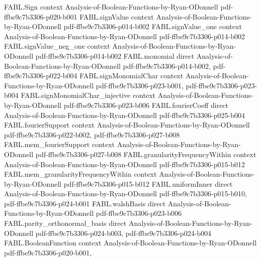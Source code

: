 \begin{theorem}
\label{FABL.noiseOperator_monomial_apply}
\leanok
{}
\proofstep
  {FABL.Sign}
  {context}
  {Analysis-of-Boolean-Functions-by-Ryan-ODonnell}
  {pdf-ffbe9c7b3306-p020-b001}
\proofstep
  {FABL.signValue}
  {context}
  {Analysis-of-Boolean-Functions-by-Ryan-ODonnell}
  {pdf-ffbe9c7b3306-p014-b002}
\proofstep
  {FABL.signValue_one}
  {context}
  {Analysis-of-Boolean-Functions-by-Ryan-ODonnell}
  {pdf-ffbe9c7b3306-p014-b002}
\proofstep
  {FABL.signValue_neg_one}
  {context}
  {Analysis-of-Boolean-Functions-by-Ryan-ODonnell}
  {pdf-ffbe9c7b3306-p014-b002}
\proofstep
  {FABL.monomial}
  {direct}
  {Analysis-of-Boolean-Functions-by-Ryan-ODonnell}
  {pdf-ffbe9c7b3306-p014-b002,
    pdf-ffbe9c7b3306-p022-b004}
\proofstep
  {FABL.signMonomialChar}
  {context}
  {Analysis-of-Boolean-Functions-by-Ryan-ODonnell}
  {pdf-ffbe9c7b3306-p023-b001,
    pdf-ffbe9c7b3306-p023-b004}
\proofstep
  {FABL.signMonomialChar_injective}
  {context}
  {Analysis-of-Boolean-Functions-by-Ryan-ODonnell}
  {pdf-ffbe9c7b3306-p023-b006}
\proofstep
  {FABL.fourierCoeff}
  {direct}
  {Analysis-of-Boolean-Functions-by-Ryan-ODonnell}
  {pdf-ffbe9c7b3306-p025-b004}
\proofstep
  {FABL.fourierSupport}
  {context}
  {Analysis-of-Boolean-Functions-by-Ryan-ODonnell}
  {pdf-ffbe9c7b3306-p022-b002,
    pdf-ffbe9c7b3306-p027-b008}
\proofstep
  {FABL.mem_fourierSupport}
  {context}
  {Analysis-of-Boolean-Functions-by-Ryan-ODonnell}
  {pdf-ffbe9c7b3306-p027-b008}
\proofstep
  {FABL.granularityFrequencyWithin}
  {context}
  {Analysis-of-Boolean-Functions-by-Ryan-ODonnell}
  {pdf-ffbe9c7b3306-p015-b012}
\proofstep
  {FABL.mem_granularityFrequencyWithin}
  {context}
  {Analysis-of-Boolean-Functions-by-Ryan-ODonnell}
  {pdf-ffbe9c7b3306-p015-b012}
\proofstep
  {FABL.uniformInner}
  {direct}
  {Analysis-of-Boolean-Functions-by-Ryan-ODonnell}
  {pdf-ffbe9c7b3306-p015-b010,
    pdf-ffbe9c7b3306-p024-b001}
\proofstep
  {FABL.walshBasis}
  {direct}
  {Analysis-of-Boolean-Functions-by-Ryan-ODonnell}
  {pdf-ffbe9c7b3306-p023-b006}
\proofstep
  {FABL.parity_orthonormal_basis}
  {direct}
  {Analysis-of-Boolean-Functions-by-Ryan-ODonnell}
  {pdf-ffbe9c7b3306-p024-b003,
    pdf-ffbe9c7b3306-p024-b004}
\proofstep
  {FABL.BooleanFunction}
  {context}
  {Analysis-of-Boolean-Functions-by-Ryan-ODonnell}
  {pdf-ffbe9c7b3306-p020-b001,
}
\end{theorem}
